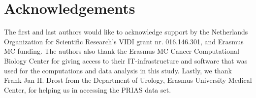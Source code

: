 
\section*{Acknowledgements}
The first and last authors would like to acknowledge support by the Netherlands Organization for Scientific Research's VIDI grant nr. 016.146.301, and Erasmus MC funding. The authors also thank the Erasmus MC Cancer Computational Biology Center for giving access to their IT-infrastructure and software that was used for the computations and data analysis in this study. Lastly, we thank Frank-Jan H. Drost from the Department of Urology, Erasmus University Medical Center, for helping us in accessing the PRIAS data set. \vspace*{-8pt}